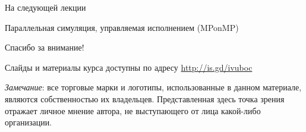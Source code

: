 \documentclass{beamer}
\begin{document}
\begin{frame}{На следующей лекции}
\centering

Параллельная симуляция, управляемая исполнением (MPonMP)

\end{frame}


\begin{frame}

{\huge{Спасибо за внимание!}\par}

\vfill

Слайды и материалы курса доступны по адресу \url{http://is.gd/ivuboc} %

\vfill

\tiny{\textit{Замечание}: все торговые марки и логотипы, использованные в данном материале, являются собственностью их владельцев. Представленная здесь точка зрения отражает личное мнение автора, не выступающего от лица какой-либо организации.}

\end{frame}
\end{document}
